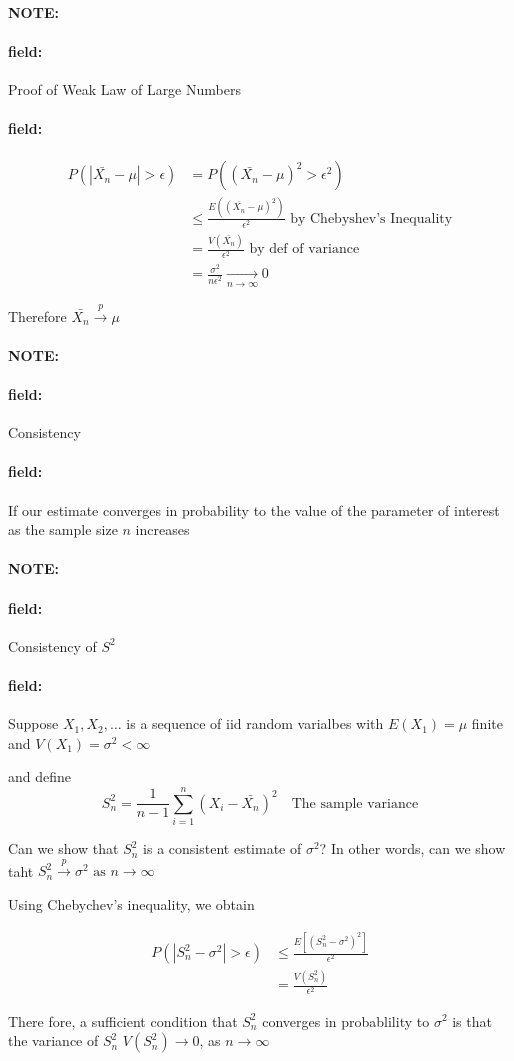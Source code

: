 \documentclass[12pt]{article}
\newenvironment{note}{\paragraph{NOTE:}}{}
\newenvironment{field}{\paragraph{field:}}{}
\begin{document}
\begin{note}
  \begin{field}
    Proof of Weak Law of Large Numbers
  \end{field}
  \begin{field}
    \begin{align*}
      P(|\bar{X_n} - \mu| > \epsilon ) &= P((\bar{X_n} - \mu)^2 > \epsilon^2)\\
      &\leq \frac{E((\bar{X_n} - \mu)^2)}{\epsilon^2} \text{ by Chebyshev's Inequality}\\
      &= \frac{V(\bar{X_n})}{\epsilon^2} \text{ by def of variance}\\
      &= \frac{\sigma^2}{n \epsilon^2} \underset{n \to \infty}{\to} 0
    \end{align*}

    Therefore $\bar{X_n} \overset{p}{\to} \mu$
  \end{field}
\end{note}


\begin{note}
  \begin{field}
    Consistency
  \end{field}
  \begin{field}
    If our estimate converges in probability to the value of the parameter of interest as the sample size $n$ increases
  \end{field}
\end{note}

\begin{note}
  \begin{field}
    Consistency of $S^2$
  \end{field}
  \begin{field}
    Suppose $X_1, X_2, \ldots$ is a sequence of iid random varialbes with $E(X_1) = \mu$ finite and $V(X_1) = \sigma^2 < \infty$

    and define $$ S_n^2 = \frac{1}{n-1}\sum_{i = 1}^n(X_i - \bar{X_n})^2 \quad \text{The sample variance}$$

    Can we show that $S_n^2$ is a consistent estimate of $\sigma^2$? In other words, can we show taht $S_n^2 \overset{p}{\to} \sigma^2 \text{ as } n \to \infty$

    Using Chebychev's inequality, we obtain

    \begin{align*}
      P(|S_n^2 - \sigma^2| > \epsilon ) &\leq \frac{E[(S_n^2 - \sigma^2)^2]}{\epsilon^2}\\
      &= \frac{V(S_n^2)}{\epsilon^2}
    \end{align*}

    There fore, a sufficient condition that $S_n^2$ converges in probablility to $\sigma^2$ is that the variance of $S_n^2$  $V(S_n^2) \to 0$, as $n \to \infty$
  \end{field}
\end{note}
\end{document}
